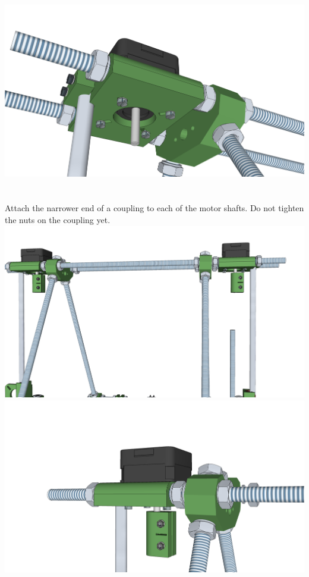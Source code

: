 \documentclass[twoside,a4paper,titlepage]{memoir}
\begin{document}
	\includegraphics[width=1\linewidth]{graphics/ch8_19_4.png}
	
	\section{}
	Attach the narrower end of a coupling to each of the motor shafts. Do not tighten the nuts on the
	coupling yet.\\
	\includegraphics[width=1\linewidth]{graphics/ch8_20_1.png}
	\includegraphics[width=1\linewidth]{graphics/ch8_20_2.png}
	
\end{document}
